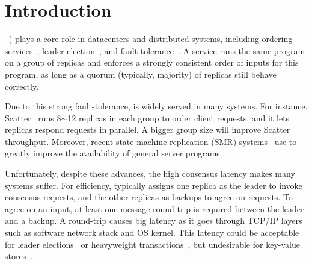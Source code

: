 \section{Introduction} \label{sec:intro}


\paxos~\cite{paxos:practical,paxos,paxos:simple,paxos:complex}) plays a core
role in datacenters and distributed systems, including ordering
services~\cite{ellis:thesis,manos:hotdep10,scatter:sosp11},
leader election~\cite{zookeeper, chubby:osdi}, and
fault-tolerance~\cite{eve:osdi12,rex:eurosys14,crane:sosp15}. A \paxos service
runs the same program on a group of replicas and enforces a strongly
consistent order of inputs for this program, as long as a quorum (typically,
majority) of replicas still behave correctly.

Due to this strong fault-tolerance, \paxos is widely served in many systems.
For instance, Scatter~\cite{scatter:sosp11} runs 8$\sim$12 replicas in each
\paxos group to order client requests, and it lets replicas respond requests
in parallel. A bigger group size will improve Scatter throughput. Moreover, 
recent state machine replication (SMR) systems~\cite{ crane:sosp15,
eve:osdi12, rex:eurosys14} use \paxos to greatly improve the availability of
general server programs.






Unfortunately, despite these advances, the high \paxos consensus latency makes
many systems suffer. For efficiency, \paxos typically assigns one replica as
the leader to invoke consensus requests, and the other replicas as backups to
agree on requests. To agree on an input, at least one message round-trip is
required between the leader and a backup. A round-trip causes big latency as it
goes through TCP/IP layers such as software network stack and OS kernel. This
latency could be acceptable for leader elections~\cite{chubby:osdi,zookeeper} or
heavyweight transactions~\cite{crane:sosp15,eve:osdi12}, but undesirable for
key-value stores~\cite{redis,memcached}.

